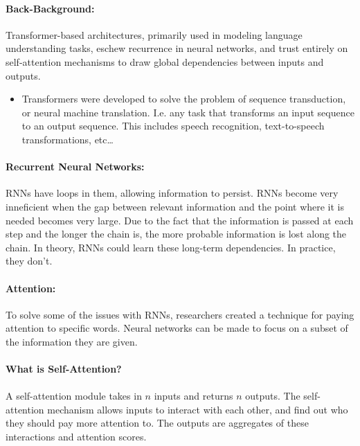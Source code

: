\documentclass{article}
\begin{document}
\paragraph{Back-Background:}Transformer-based architectures, primarily used in modeling language
understanding tasks, eschew recurrence in neural networks, and trust entirely on self-attention mechanisms
to draw global dependencies between inputs and outputs.

\begin{itemize}
    \item Transformers were developed to solve the problem of sequence transduction, or neural machine
        translation. I.e. any task that transforms an input sequence to an output sequence. This includes
        speech recognition, text-to-speech transformations, etc\ldots
\end{itemize}

\paragraph{Recurrent Neural Networks:}RNNs have loops in them, allowing information to persist. RNNs become
very inneficient when the gap between relevant information and the point where it is needed becomes very
large. Due to the fact that the information is passed at each step and the longer the chain is, the
more probable information is lost along the chain. In theory, RNNs could learn these long-term
dependencies. In practice, they don't.

\paragraph{Attention:}To solve some of the issues with RNNs, researchers created a technique for paying
attention to specific words. Neural networks can be made to focus on a subset of the information they are
given.

\paragraph{What is Self-Attention?}
\paragraph{}A self-attention module takes in $n$ inputs and returns $n$ outputs. The self-attention
mechanism allows inputs to interact with each other, and find out who they should pay more attention to.
The outputs are aggregates of these interactions and attention scores.
\end{document}
